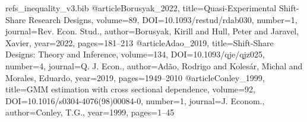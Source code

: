 \begin{filecontents*}[overwrite]{refs_inequality_v3.bib}
@article{Borusyak_2022, title={Quasi-Experimental Shift-Share Research Designs}, volume={89}, DOI={10.1093/restud/rdab030}, number={1}, journal={Rev. Econ. Stud.}, author={Borusyak, Kirill and Hull, Peter and Jaravel, Xavier}, year={2022}, pages={181--213} }
@article{Adao_2019, title={Shift-Share Designs: Theory and Inference}, volume={134}, DOI={10.1093/qje/qjz025}, number={4}, journal={Q. J. Econ.}, author={Ad\~ao, Rodrigo and Koles\'ar, Michal and Morales, Eduardo}, year={2019}, pages={1949--2010} }
@article{Conley_1999, title={{GMM} estimation with cross sectional dependence}, volume={92}, DOI={10.1016/s0304-4076(98)00084-0}, number={1}, journal={J. Econom.}, author={Conley, T.G.}, year={1999}, pages={1--45} }
\end{filecontents*}

\documentclass[review,3p,times,authoryear]{elsarticle}

\usepackage{lineno,hyperref}
\usepackage{amsmath,amssymb}
\usepackage{graphicx}
\usepackage{booktabs}
\usepackage{threeparttable}
\usepackage{multirow}
\usepackage{url}
\usepackage{float}

\providecommand{\DOIprefix}{}\renewcommand{\DOIprefix}{}
\providecommand{\URLprefix}{}\renewcommand{\URLprefix}{}
\providecommand{\doi}[1]{}\renewcommand{\doi}[1]{\href{https://doi.org/#1}{\nolinkurl{https://doi.org/#1}}}

\makeatletter
\long{}
\makeatother
{}

\newcommand{\sym}[1]{\ensuremath{^{#1}}}



